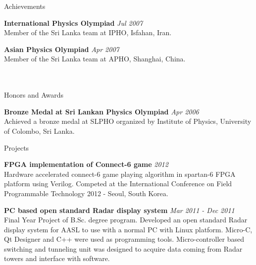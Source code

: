 \documentclass[
11pt, %
]{./../assets/resume} %
\begin{document}
\begin{rSection}{Achievements}

	\textbf{International Physics Olympiad} \hfill \textit{Jul 2007}\\
	Member of the Sri Lanka team at IPHO, Isfahan, Iran.

	\textbf{Asian Physics Olympiad} \hfill \textit{Apr 2007}\\
	Member of the Sri Lanka team at APHO, Shanghai, China.
	\\
	\\
	\\

\end{rSection}
\begin{rSection}{Honors and Awards}

	\textbf{Bronze Medal at Sri Lankan Physics Olympiad} \hfill \textit{Apr 2006}\\
	Achieved a bronze medal at SLPHO organized by Institute of Physics, University of Colombo, Sri Lanka.


\end{rSection}

\begin{rSection}{Projects}

	\textbf{FPGA implementation of Connect-6 game} \hfill \textit{2012}\\
	Hardware accelerated connect-6 game playing algorithm in spartan-6 FPGA platform using Verilog. 
	Competed at the International Conference on Field Programmable Technology 2012 - Seoul, South Korea.

	\textbf{PC based open standard Radar display system} \hfill \textit{Mar 2011 - Dec 2011}\\
	Final Year Project of B.Sc. degree program.
	Developed an open standard Radar display system for AASL to use with a normal PC
	with Linux platform. Micro-C, Qt Designer and C++ were used as programming tools.
	Micro-controller based switching and tunneling unit was designed to acquire data coming from Radar towers and interface with software.

\end{rSection}
\end{document}
